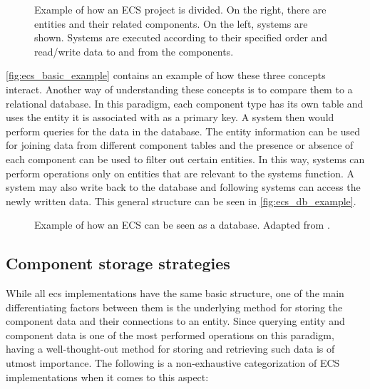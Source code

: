 \documentclass[twoside, 11pt]{article}
\begin{document}
\begin{figure}[h]
  \centering
  
  \caption[Example of how an ECS project is divided]{Example of how an ECS project is divided. On the right, there are entities and their related components. On the left, systems are shown. Systems are executed according to their specified order and read/write data to and from the components.}
  \label{fig:ecs_basic_example}
\end{figure}

\autoref{fig:ecs_basic_example} contains an example of how these three concepts interact.  Another way of understanding these concepts is to compare them to a relational database. In this paradigm, each component type has its own table and uses the entity it is associated with as a primary key. A system then would perform queries for the data in the database. The entity information can be used for joining data from different component tables and the presence or absence of each component can be used to filter out certain entities. In this way, systems can perform operations only on entities that are relevant to the systems function. A system may also write back to the database and following systems can access the newly written data. This general structure can be seen in \autoref{fig:ecs_db_example}.

\begin{figure}
  \centering
  
  \caption[Example of how an ECS can be seen as a database]{Example of how an ECS can be seen as a database. Adapted from \cite{csherratt}.}
  \label{fig:ecs_db_example}
\end{figure}

\subsection{Component storage strategies}

While all \gls{ecs} implementations have the same basic structure, one of the main differentiating factors between them is the underlying method for storing the component data and their connections to an entity. Since querying entity and component data is one of the most performed operations on this paradigm, having a well-thought-out method for storing and retrieving such data is of utmost importance. The following is a non-exhaustive categorization of ECS implementations when it comes to this aspect:
\end{document}
